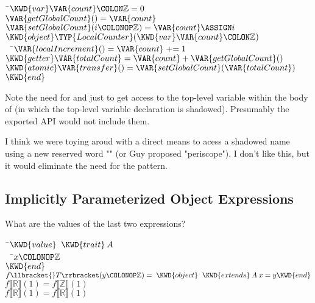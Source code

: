 \begin{Fortress}
{\tt~}\pushtabs\=\+\( \KWD{var} \VAR{count}\COLON \mathbb{Z} = 0\)\\
\( \VAR{getGlobalCount}() = \VAR{count}\)\\
\( \VAR{setGlobalCount}(i\COLONOP\mathbb{Z}) = \VAR{count} \ASSIGN i\)\\[4pt]
\( \KWD{object} \TYP{LocalCounter}(\KWD{var} \VAR{count}\COLON \mathbb{Z})\)\\
{\tt~~}\pushtabs\=\+\(   \VAR{localIncrement}() = \VAR{count} \mathrel{+}= 1\)\\
\(   \KWD{getter} \VAR{totalCount} = \VAR{count} + \VAR{getGlobalCount}()\)\\
\(   \KWD{atomic} \VAR{transfer}() = \VAR{setGlobalCount}(\VAR{totalCount})\)\-\\\poptabs
\( \KWD{end}\)\-\\\poptabs
\end{Fortress}

Note the need for  and  just to get
access to the top-level variable  within the body of
 (in which the top-level  variable declaration
is shadowed).  Presumably the exported API would not include them.

I think we were toying aroud with a direct means to acess a shadowed name
using a new reserved word "" (or Guy proposed "periscope").  I
don't like this, but it would eliminate the need for the pattern.

\subsection{Implicitly Parameterized Object Expressions}

What are the values of the last two expressions?

\begin{Fortress}
{\tt~}\pushtabs\=\+\( \KWD{value}\;\;\KWD{trait}\:A\)\\
{\tt~~}\pushtabs\=\+\(   x\COLONOP\mathbb{Z}\)\-\\\poptabs
\( \KWD{end}\)\\
\( f\llbracket{}T\rrbracket(y\COLONOP\mathbb{Z}) = \;\KWD{object}\;\;\KWD{extends}\:A\:x = y \KWD{end}\)\\
\( f\llbracket\mathbb{R}\rrbracket(1) = f\llbracket\mathbb{Z}\rrbracket(1)\)\\
\( f\llbracket\mathbb{R}\rrbracket(1) = f\llbracket\mathbb{R}\rrbracket(1)\)\-\\\poptabs
\end{Fortress}


